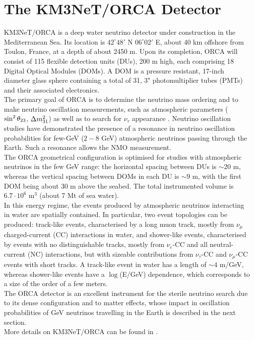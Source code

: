\section{The KM3NeT/ORCA Detector}
\label{sec:km3net}
KM3NeT/ORCA is a deep water neutrino detector under construction in the Mediterranean Sea. Its location is $42^\circ 48'$ N $06^\circ 02'$ E, about 40 km offshore from Toulon, France, at a depth of about 2450 m. Upon its completion, ORCA will consist of 115 flexible detection units (DUs), 200 m high, each comprising 18 Digital Optical Modules (DOMs). A DOM is a pressure resistant, 17-inch diameter glass sphere containing a total of 31, 3" photomultiplier tubes (PMTs) and their associated electronics. 
\\
The primary goal of ORCA is to determine the neutrino mass ordering and to make neutrino oscillation measurements, such as atmospheric parameters ($\sin^2\theta_{23}$, $\Delta m^2_{31}$) as well as to search for $\nu_\tau$ appearance \cite{ORCA_NMO_Paper}. Neutrino oscillation studies \cite{loi} have demonstrated the presence of a resonance in neutrino oscillation probabilities for few-GeV ($2-8$ GeV) atmospheric neutrinos passing through the Earth. Such a resonance allows the NMO \cite{loi} measurement. 
\\
The ORCA geometrical configuration is optimised for studies with atmospheric neutrinos in the few GeV range: the horizontal spacing between DUs is $\sim 20$ m, whereas the vertical spacing between DOMs in each DU is $\sim 9$ m, with the first DOM being about 30 m above the seabed. The total instrumented volume is $6.7 \cdot 10^6$ m$^3$ (about 7 Mt of sea water). 
\\
In this energy regime, the events produced by atmospheric neutrinos interacting in water are spatially contained. In particular, two event topologies can be produced: track-like events, characterised by a long muon track, mostly from $\nu_\mu$ charged-current (CC) interactions in water, and shower-like events, characterised by events with no distinguishable tracks, mostly from $\nu_e$-CC and all neutral-current (NC) interactions, but with sizeable contributions from $\nu_\tau$-CC and $\nu_\mu$-CC events with short tracks. A track-like event in water has a length of $\sim 4$ m/GeV, whereas shower-like events have a $\log$(E/GeV) dependence, which corresponds to a size of the order of a few meters.
\\
The ORCA detector is an excellent instrument for the sterile neutrino search due to its dense configuration and to matter effects, whose impact in oscillation probabilities of GeV neutrinos travelling in the Earth is described in the next section.
\\
More details on KM3NeT/ORCA can be found in \cite{loi, ORCA_NMO_Paper}.